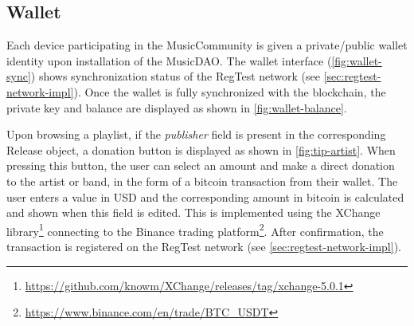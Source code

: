 \subsection{Wallet}
Each device participating in the MusicCommunity is given a private/public wallet identity upon installation of the MusicDAO. The wallet interface (\ref{fig:wallet-sync}) shows synchronization status of the RegTest network (see \ref{sec:regtest-network-impl}). Once the wallet is fully synchronized with the blockchain, the private key and balance are displayed as shown in \ref{fig:wallet-balance}. 

Upon browsing a playlist, if the \textit{publisher} field is present in the corresponding Release object, a donation button is displayed as shown in \ref{fig:tip-artist}. When pressing this button, the user can select an amount and make a direct donation to the artist or band, in the form of a bitcoin transaction from their wallet. The user enters a value in USD and the corresponding amount in bitcoin is calculated and shown when this field is edited. This is implemented using the XChange library\footnote{\url{https://github.com/knowm/XChange/releases/tag/xchange-5.0.1}} connecting to the Binance trading platform\footnote{\url{https://www.binance.com/en/trade/BTC_USDT}}. After confirmation, the transaction is registered on the RegTest network (see \ref{sec:regtest-network-impl}). 

